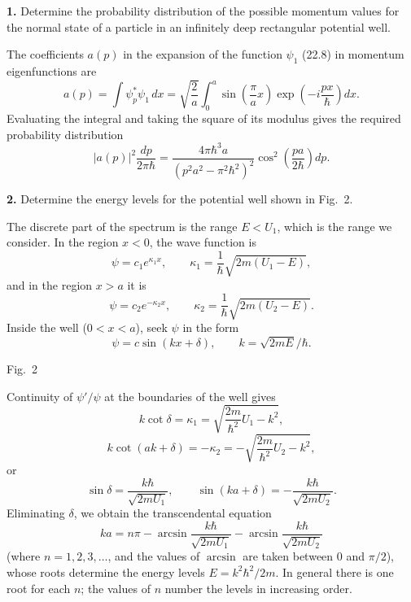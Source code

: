 \ProblemHeading
\noindent\textbf{1.} Determine the probability distribution of the possible
momentum values for the normal state of a particle in an infinitely deep
rectangular potential well.

\SolutionHeading
The coefficients $a(p)$ in the expansion of the function $\psi_1$ (22.8) in
momentum eigenfunctions are
\[
  a(p)=\int\psi_p^*\psi_1\,dx
  =\sqrt{\frac{2}{a}}\int_0^a
  \sin\left(\frac{\pi}{a}x\right)
  \exp\left(-i\frac{px}{\hbar}\right)dx.
\]
Evaluating the integral and taking the square of its modulus gives the
required probability distribution
\[
  |a(p)|^2\frac{dp}{2\pi\hbar}
  =\frac{4\pi\hbar^3a}{{\left(p^2a^2-\pi^2\hbar^2\right)}^2}
  \cos^2\left(\frac{pa}{2\hbar}\right)dp.
\]

\ProblemHeading
\noindent\textbf{2.} Determine the energy levels for the potential well shown
in Fig.~2.

\SolutionHeading
The discrete part of the spectrum is the range $E<U_1$, which is the range we
consider. In the region $x<0$, the wave function is
\[
  \psi=c_1e^{\kappa_1x},
  \qquad \kappa_1=\frac{1}{\hbar}\sqrt{2m(U_1-E)},
\]
and in the region $x>a$ it is
\[
  \psi=c_2e^{-\kappa_2x},
  \qquad \kappa_2=\frac{1}{\hbar}\sqrt{2m(U_2-E)}.
\]
Inside the well ($0<x<a$), seek $\psi$ in the form
\[
  \psi=c\sin(kx+\delta),
  \qquad k=\sqrt{2mE}/\hbar.
\]

\begin{center}

\small Fig.~2
\end{center}

Continuity of $\psi'/\psi$ at the boundaries of the well gives
\[
  k\cot\delta=\kappa_1
  =\sqrt{\frac{2m}{\hbar^2}U_1-k^2},
\]
\[
  k\cot(ak+\delta)=-\kappa_2
  =-\sqrt{\frac{2m}{\hbar^2}U_2-k^2},
\]
or
\[
  \sin\delta=\frac{k\hbar}{\sqrt{2mU_1}},
  \qquad
  \sin(ka+\delta)=-\frac{k\hbar}{\sqrt{2mU_2}}.
\]
Eliminating $\delta$, we obtain the transcendental equation
\begin{equation}
  ka=n\pi-\arcsin\frac{k\hbar}{\sqrt{2mU_1}}
  -\arcsin\frac{k\hbar}{\sqrt{2mU_2}}
  \tag{1}
\end{equation}
(where $n=1,2,3,\ldots$, and the values of $\arcsin$ are taken between $0$
and $\pi/2$), whose roots determine the energy levels
$E=k^2\hbar^2/2m$. In general there is one root for each $n$; the values of
$n$ number the levels in increasing order.


